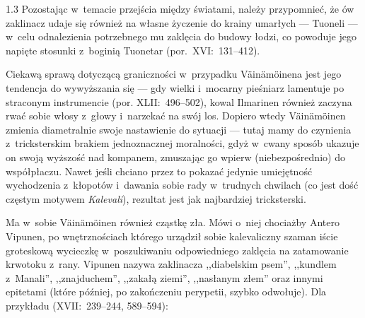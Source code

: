 \documentclass[11pt,a4paper,twoside]{report}
\begin{document}
\begin{spacing}{1.3}
Pozostając w~temacie przejścia między światami, należy przypomnieć, że ów zaklinacz udaje się również na własne życzenie do krainy umarłych --- Tuoneli --- w~celu odnalezienia potrzebnego mu zaklęcia do budowy łodzi, co powoduje jego napięte stosunki z~boginią Tuonetar (por.~XVI:~131--412).

Ciekawą sprawą dotyczącą graniczności w~przypadku Väinämöinena jest jego tendencja do wywyższania się --- gdy wielki i~mocarny pieśniarz lamentuje po straconym instrumencie (por. XLII:~496--502), kowal Ilmarinen również zaczyna rwać sobie włosy z~głowy i~narzekać na swój los. Dopiero wtedy Väinämöinen zmienia diametralnie swoje nastawienie do sytuacji --- tutaj mamy do czynienia z~tricksterskim brakiem jednoznacznej moralności, gdyż w~cwany sposób ukazuje on swoją wyższość nad kompanem, zmuszając go wpierw (niebezpośrednio) do współpłaczu. Nawet jeśli chciano przez to pokazać jedynie umiejętność wychodzenia z~kłopotów i~dawania sobie rady w~trudnych chwilach (co jest dość częstym motywem \emph{Kalevali}), rezultat jest jak najbardziej tricksterski.

Ma w~sobie Väinämöinen również cząstkę zła. Mówi o~niej chociażby Antero Vipunen, po wnętrznościach którego urządził sobie kalevaliczny szaman iście groteskową wycieczkę w~poszukiwaniu odpowiedniego zaklęcia na zatamowanie krwotoku z~rany. Vipunen nazywa zaklinacza ,,diabelskim psem'', ,,kundlem z~Manali'', ,,znajduchem'', ,,zakałą ziemi'', ,,nasłanym złem'' oraz innymi epitetami (które później, po zakończeniu perypetii, szybko odwołuje). Dla przykładu (XVII:~239--244, 589--594):
\end{spacing}
\end{document}
